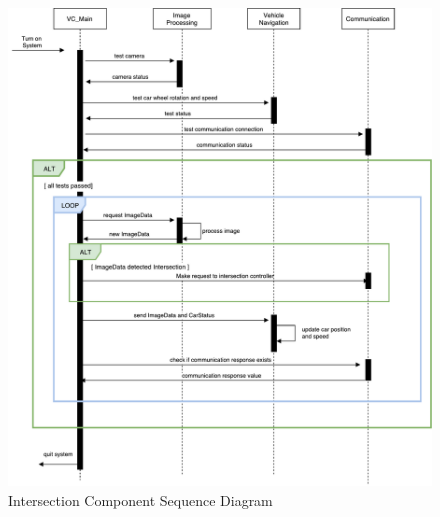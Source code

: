 \documentclass [10pt]{article}
\begin{document}
\begin {figure}[h!]
\centering
\caption{Intersection Component Sequence Diagram} \vspace{4mm}
\includegraphics [scale = .6, trim={0 0 0 0},clip] {figures/carSequenceDiag.pdf}

\end {figure}





\end{document}
